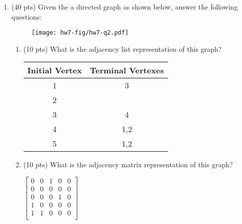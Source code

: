 \documentclass[11pt]{article}
\begin{document}
\begin{enumerate}



  \item(40 pts) Given the a directed graph as shown below, answer the following questions:
  \begin{figure}[!ht]
  \begin{center}
  \texttt{[image: hw7-fig/hw7-q2.pdf]}
  \end{center}
  \end{figure}


\begin{enumerate}
  \item (10 pts) What is the adjacency list representation of this graph? \\
    \begin{center}
      \begin{tabular}{|c|c|}
      \hline
      Initial Vertex & Terminal Vertexes \\
      \hline
      1 & 3  \\
      2 &     \\
      3 & 4 \\
      4 & 1,2 \\
      5 & 1,2\\
    \hline
    \end{tabular}
  \end{center}
    
  \item (10 pts) What is the adjacency matrix representation of this graph? \\
    \begin{center}
      $\begin{bmatrix}
        0 & 0 & 1 & 0 & 0 \\
        0 & 0 & 0 & 0 & 0 \\
        0 & 0 & 0 & 1 & 0 \\
        1 & 0 & 0 & 0 & 0 \\
        1 & 1 & 0 & 0 & 0 \\
      \end{bmatrix}$
    \end{center}
    

\end{enumerate}
\end{enumerate}
\end{document}
